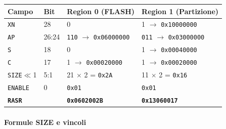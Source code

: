 \begin{table}[htbp]
\centering
\begin{tabular}{|l|l|l|l|}
\hline
\textbf{Campo} & \textbf{Bit} & \textbf{Region 0 (FLASH)} & \textbf{Region 1 (Partizione)} \\
\hline
\texttt{XN} & 28 & 0 & 1 $\rightarrow$ \texttt{0x10000000} \\
\hline
\texttt{AP} & 26:24 & \texttt{110} $\rightarrow$ \texttt{0x06000000} & \texttt{011} $\rightarrow$ \texttt{0x03000000} \\
\hline
\texttt{S} & 18 & 0 & 1 $\rightarrow$ \texttt{0x00040000} \\
\hline
\texttt{C} & 17 & 1 $\rightarrow$ \texttt{0x00020000} & 1 $\rightarrow$ \texttt{0x00020000} \\
\hline
\texttt{SIZE}$\ll$1 & 5:1 & 21 $\times$ 2 = \texttt{0x2A} & 11 $\times$ 2 = \texttt{0x16} \\
\hline
\texttt{ENABLE} & 0 & \texttt{0x01} & \texttt{0x01} \\
\hline
\textbf{\texttt{RASR}} & & \textbf{\texttt{0x0602002B}} & \textbf{\texttt{0x13060017}} \\
\hline
\end{tabular}
\end{table}

\paragraph*{Formule SIZE e vincoli}

